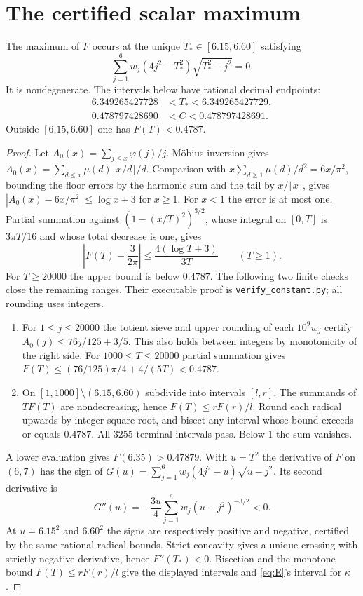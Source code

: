 \documentclass[11pt]{article}
\newcommand{\tp}{T_{\!*}}\newcommand{\rank}{\operatorname{rank}}
\begin{document}
\section{The certified scalar maximum}
\begin{lemma}\label{lem:max}
The maximum of $F$ occurs at the unique $\tp\in[6.15,6.60]$ satisfying
\begin{equation}
 \sum_{j=1}^6 w_j(4j^2-\tp^2)\sqrt{\tp^2-j^2}=0. \label{eq:root}
\end{equation}
It is nondegenerate. The intervals below have rational decimal endpoints:
\[
 \begin{split}
 6.349265427728&<\tp<6.349265427729,\\
 0.478797428690&<C<0.478797428691.
 \end{split}
\]
Outside $[6.15,6.60]$ one has $F(T)<0.4787$.
\end{lemma}
\begin{proof}
Let $A_0(x)=\sum_{j\le x}\varphi(j)/j$. M\"obius inversion gives
$A_0(x)=\sum_{d\le x}\mu(d)\lfloor x/d\rfloor/d$.
Comparison with $x\sum_{d\ge1}\mu(d)/d^2=6x/\pi^2$, bounding the floor errors by the harmonic sum and the tail by $x/\lfloor x\rfloor$, gives $|A_0(x)-6x/\pi^2|\le\log x+3$ for $x\ge1$. For $x<1$ the error is at most one. Partial summation against $(1-(x/T)^2)^{3/2}$, whose integral on $[0,T]$ is $3\pi T/16$ and whose total decrease is one, gives
\[
 \left|F(T)-\frac{3}{2\pi}\right|\le \frac{4(\log T+3)}{3T}\qquad(T\ge1).
\]
For $T\ge20000$ the upper bound is below $0.4787$. The following two finite checks close the remaining ranges. Their executable proof is \texttt{verify\_constant.py}; all rounding uses integers.
\begin{enumerate}[leftmargin=*,itemsep=2pt]
\item For $1\le j\le20000$ the totient sieve and upper rounding of each $10^9 w_j$ certify $A_0(j)\le 76j/125+3/5$. This also holds between integers by monotonicity of the right side. For $1000\le T\le20000$ partial summation gives $F(T)\le(76/125)\pi/4+4/(5T)<0.4787$.
\item On $[1,1000]\setminus(6.15,6.60)$ subdivide into intervals $[l,r]$. The summands of $TF(T)$ are nondecreasing, hence $F(T)\le r F(r)/l$. Round each radical upwards by integer square root, and bisect any interval whose bound exceeds or equals $0.4787$. All $3255$ terminal intervals pass. Below $1$ the sum vanishes.
\end{enumerate}
A lower evaluation gives $F(6.35)>0.47879$. With $u=T^2$ the derivative of $F$ on $(6,7)$ has the sign of $G(u)=\sum_{j=1}^6w_j(4j^2-u)\sqrt{u-j^2}$. Its second derivative is
\[
 G''(u)=-\frac{3u}{4}\sum_{j=1}^6w_j(u-j^2)^{-3/2}<0 .
\]
At $u=6.15^2$ and $6.60^2$ the signs are respectively positive and negative, certified by the same rational radical bounds. Strict concavity gives a unique crossing with strictly negative derivative, hence $F''(\tp)<0$. Bisection and the monotone bound $F(T)\le rF(r)/l$ give the displayed intervals and \eqref{eq:E}'s interval for $\kappa$.
\end{proof}
\end{document}
